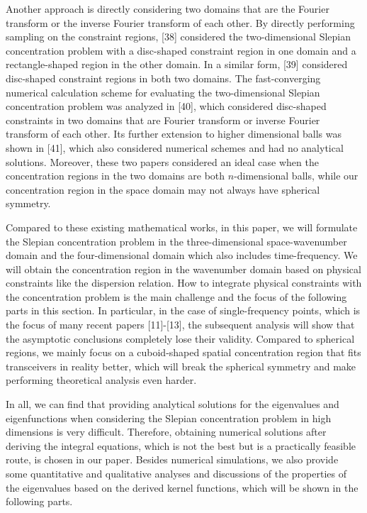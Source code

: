 \documentclass[a4paper,12pt]{article}
\begin{document}
\begin{framed}
{   	\quad Another approach is directly considering two domains that are the Fourier transform or the inverse Fourier transform of each other. By directly performing sampling on the constraint regions, [38] considered the two-dimensional Slepian concentration problem with a disc-shaped constraint region in one domain and a rectangle-shaped region in the other domain. In a similar form, [39] considered disc-shaped constraint regions in both two domains. 
   	The fast-converging numerical calculation scheme for evaluating the two-dimensional Slepian concentration problem was analyzed in [40], which considered disc-shaped constraints in two domains that are Fourier transform or inverse Fourier transform of each other. 
   	Its further extension to higher dimensional balls was shown in [41], which also considered numerical schemes and had no analytical solutions. Moreover, these two papers considered an ideal case when the concentration regions in the two domains are both $n$-dimensional balls, while our concentration region in the space domain may not always have spherical symmetry. 
   	
   	\quad Compared to these existing mathematical works, in this paper, we will formulate the Slepian concentration problem in the three-dimensional space-wavenumber domain and the four-dimensional domain which also includes time-frequency. We will obtain the concentration region in the wavenumber domain based on physical constraints like the dispersion relation. How to integrate physical constraints with the concentration problem is the main challenge and the focus of the following parts in this section. In particular, in the case of single-frequency points, which is the focus of many recent papers [11]-[13], the subsequent analysis will show that the asymptotic conclusions completely lose their validity. Compared to spherical regions, we mainly focus on a cuboid-shaped spatial concentration region that fits transceivers in reality better, which will break the spherical symmetry and make performing theoretical analysis even harder.   
   	
   	\quad In all, we can find that providing analytical solutions for the eigenvalues and eigenfunctions when considering the Slepian concentration problem in high dimensions is very difficult. Therefore, obtaining numerical solutions after deriving the integral equations, which is not the best but is a practically feasible route, is chosen in our paper. Besides numerical simulations, we also provide some quantitative and qualitative analyses and discussions of the properties of the eigenvalues based on the derived kernel functions, which will be shown in the following parts.
   }
   

\end{framed}
\end{document}
